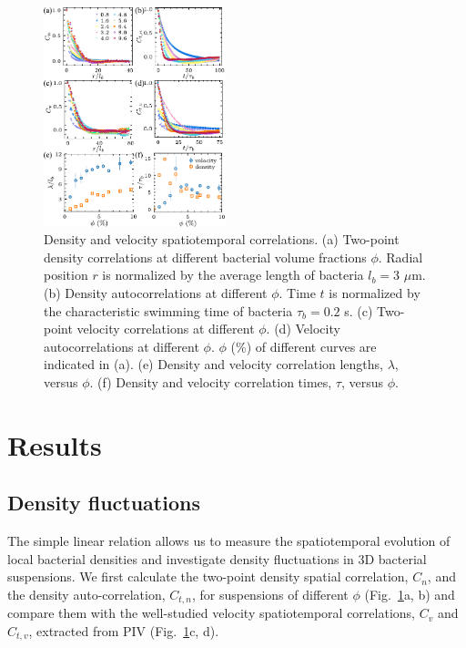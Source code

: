 \documentclass[twocolumn,aps,prx,amsmath,amssymb,longbibliography,superscriptaddress]{revtex4-2}
\begin{document}
\begin{figure}[t]
	\begin{center}
		\includegraphics[width=0.47\textwidth]{Figures/fig-2.pdf}
		\caption[spatiotemporal-correlations.]
		{
			Density and velocity spatiotemporal correlations. (a) Two-point density correlations at different bacterial volume fractions $\phi$. Radial position $r$ is normalized by the average length of bacteria $l_b = 3$ $\mu$m. (b) Density autocorrelations at different $\phi$. Time $t$ is normalized by the characteristic swimming time of bacteria $\tau_b = 0.2$ s. (c) Two-point velocity correlations at different $\phi$. (d) Velocity autocorrelations at different $\phi$. $\phi$ ($\%$) of different curves are indicated in (a). (e) Density and velocity correlation lengths, $\lambda$, versus $\phi$. (f) Density and velocity correlation times, $\tau$, versus $\phi$.
		}
		\label{fig:spatiotemporal-correlations}
	\end{center}
\end{figure}




\section{Results}

\subsection{Density fluctuations}

The simple linear relation allows us to measure the spatiotemporal evolution of local bacterial densities and investigate density fluctuations in 3D bacterial suspensions. We first calculate the two-point density spatial correlation, $C_n$, and the density auto-correlation, $C_{t,n}$, for suspensions of different $\phi$ (Fig.~\ref{fig:spatiotemporal-correlations}a, b) and compare them with the well-studied velocity spatiotemporal correlations, $C_{v}$ and $C_{t,v}$, extracted from PIV (Fig.~\ref{fig:spatiotemporal-correlations}c, d).
\end{document}
